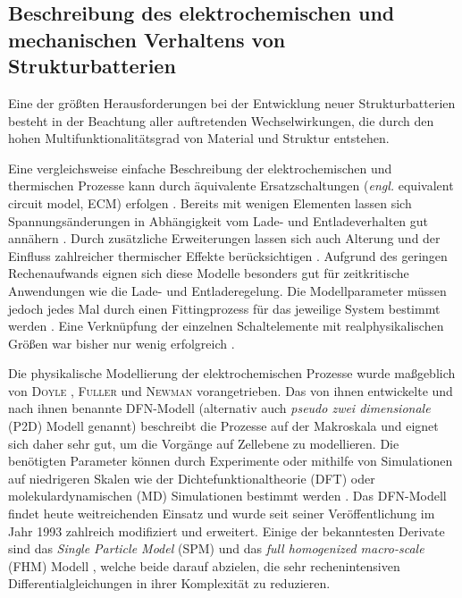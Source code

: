 \subsection{Beschreibung des elektrochemischen und mechanischen Verhaltens von Strukturbatterien}

Eine der größten Herausforderungen bei der Entwicklung neuer Strukturbatterien besteht in der Beachtung aller auftretenden Wechselwirkungen, die durch den hohen Multifunktionalitätsgrad von Material und Struktur entstehen.

Eine vergleichsweise einfache Beschreibung der elektrochemischen und thermischen Prozesse kann durch äquivalente Ersatzschaltungen (\textit{engl.} equivalent circuit model, ECM) erfolgen \cite{Bavsic2022}. Bereits mit wenigen Elementen lassen sich Spannungsänderungen in Abhängigkeit vom Lade- und Entladeverhalten gut annähern \cite{YannLiaw2004}. Durch zusätzliche Erweiterungen lassen sich auch Alterung und der Einfluss zahlreicher thermischer Effekte berücksichtigen \cite{Hannan2017,Tran2021}. Aufgrund des geringen Rechenaufwands eignen sich diese Modelle besonders gut für zeitkritische Anwendungen wie die Lade- und Entladeregelung. Die Modellparameter müssen jedoch jedes Mal durch einen Fittingprozess für das jeweilige System bestimmt werden \cite{Tomasov2019}. Eine Verknüpfung der einzelnen Schaltelemente mit realphysikalischen Größen war bisher nur wenig erfolgreich \cite{Plett2015}.

Die physikalische Modellierung der elektrochemischen Prozesse wurde maßgeblich von \textsc{Doyle} \cite{Doyle1995,Doyle2003,Ceder2002}, \textsc{Fuller} \cite{Fuller2018,Takeuchi2008} und \textsc{Newman} \cite{Doyle1995,Newman2021} vorangetrieben. Das von ihnen entwickelte und nach ihnen benannte DFN-Modell (alternativ auch \textit{pseudo zwei dimensionale} (P2D) Modell genannt) \cite{Doyle1993} beschreibt die Prozesse auf der Makroskala und eignet sich daher sehr gut, um die Vorgänge auf Zellebene zu modellieren. Die benötigten Parameter können durch Experimente oder mithilfe von Simulationen auf niedrigeren Skalen wie der Dichtefunktionaltheorie (DFT) oder molekulardynamischen (MD) Simulationen bestimmt werden \cite{Chen2022}. Das DFN-Modell findet heute weitreichenden Einsatz und wurde seit seiner Veröffentlichung im Jahr 1993 zahlreich modifiziert und erweitert. Einige der bekanntesten Derivate sind das \textit{Single Particle Model} (SPM) \cite{Li2017} und das \textit{full homogenized macro-scale} (FHM) Modell \cite{Arunachalam2019}, welche beide darauf abzielen, die sehr rechenintensiven Differentialgleichungen in ihrer Komplexität zu reduzieren.

